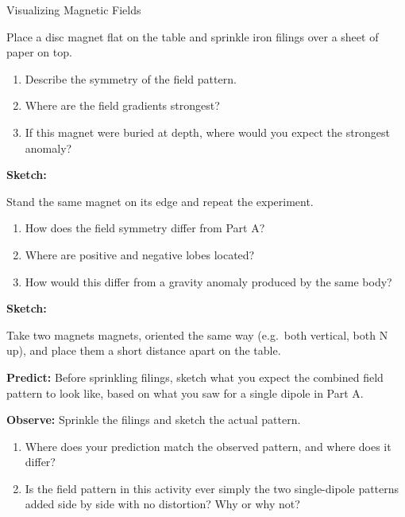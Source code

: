 \begin{activity}{Visualizing Magnetic Fields}
\begin{questions}
  Place a disc magnet flat on the table and sprinkle iron filings over a sheet of paper on top.
  \begin{enumerate}
    \item Describe the symmetry of the field pattern.
    \item Where are the field gradients strongest?
    \item If this magnet were buried at depth, where would you expect the strongest anomaly?
  \end{enumerate}

  \answerbox[3cm]

  \noindent\textbf{Sketch:}
  \answerbox[4cm]

  Stand the same magnet on its edge and repeat the experiment.
  \begin{enumerate}
    \item How does the field symmetry differ from Part A?
    \item Where are positive and negative lobes located?
    \item How would this differ from a gravity anomaly produced by the same body?
  \end{enumerate}

  \answerbox[3cm]

  \noindent\textbf{Sketch:}
  \answerbox[4cm]

  Take two magnets magnets, oriented the same way (e.g.\ both vertical, both N up), and place them a short distance apart on the table.

  \noindent\textbf{Predict:} Before sprinkling filings, sketch what you expect the combined field pattern to look like, based on what you saw for a single dipole in Part A.
  \answerbox[4cm]

  \noindent\textbf{Observe:} Sprinkle the filings and sketch the actual pattern.
  \answerbox[4cm]

  \begin{enumerate}
    \item Where does your prediction match the observed pattern, and where does it differ?
    \item Is the field pattern in this activity ever simply the two single-dipole patterns added side by side with no distortion? Why or why not?
  \end{enumerate}
  \answerbox[3cm]


\end{questions}
\end{activity}
